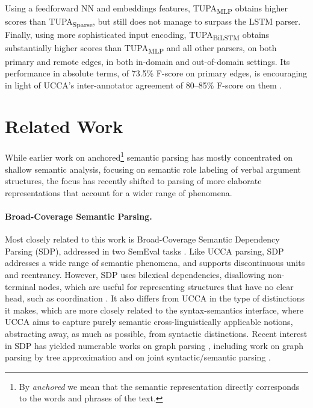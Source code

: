 \documentclass[11pt,a4paper]{article}
\newcommand{\parser}[1]{TUPA\textsubscript{#1}}
\newcommand{\secref}[1]{Section~\ref{#1}}
\begin{document}
Using a feedforward NN and embeddings features,
\parser{MLP} obtains higher scores than \parser{Sparse},
but still does not manage to surpass the LSTM parser.
Finally, using more sophisticated input encoding,
\parser{BiLSTM} obtains substantially higher scores than \parser{MLP}
and all other parsers, on both primary and remote edges,
in both in-domain and out-of-domain settings.
Its performance in absolute terms, of 73.5\% F-score on primary edges,
is encouraging in light of
UCCA's inter-annotator agreement of 80--85\%
F-score on them \cite{abend2013universal}.







\section{Related Work}\label{sec:related_work}

While earlier work on anchored\footnote{By {\it anchored} we mean that the semantic representation
directly corresponds to the words and phrases of the text.}
semantic parsing has mostly concentrated on shallow semantic analysis,
focusing on semantic role labeling of verbal argument structures,
the focus has recently shifted to parsing of more elaborate representations that account
for a wider range of phenomena.

\paragraph{Broad-Coverage Semantic Parsing.}
Most closely related to this work is Broad-Coverage Semantic Dependency Parsing (SDP),
addressed in two SemEval tasks \cite{oepen2014semeval,oepen2015semeval}.
Like UCCA parsing, SDP addresses a wide range of semantic phenomena,
and supports discontinuous units and reentrancy.
However, SDP uses bilexical dependencies, disallowing non-terminal nodes, which
are useful for representing structures that have no clear head, such as coordination
\cite[see \secref{sec:introduction}]{Ivanova2012who}. It also differs from UCCA in the type
of distinctions it makes, which are more closely related to the syntax-semantics interface,
where UCCA aims to capture purely semantic cross-linguistically applicable notions, abstracting
away, as much as possible, from syntactic distinctions.
Recent interest in SDP has yielded numerable works on graph parsing
\cite{ribeyre-villemontedelaclergerie-seddah:2014:SemEval,thomson-EtAl:2014:SemEval,almeida-martins:2015:SemEval,du-EtAl:2015:SemEval}, including work on graph parsing
by tree approximation \cite{agic-koller:2014:SemEval,schluter-EtAl:2014:SemEval}
and on joint syntactic/semantic parsing
\cite{henderson2013multilingual,swayamdipta-EtAl:2016:CoNLL}.
\end{document}
